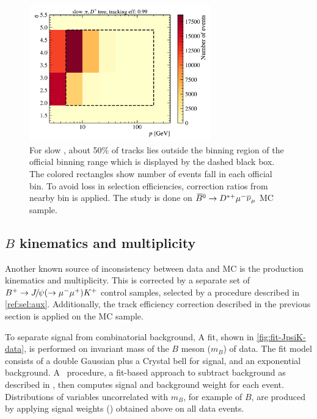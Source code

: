 \begin{figure}[htb]
    \centering
    \includegraphics[width=0.7\textwidth]{./figs-mc-correction/reweighting-tracking/Dst_spi_p_eta.pdf}
    \caption{
        For slow \pion, about 50\% of tracks lies outside the binning region
        of the official \trackcalib binning range which is displayed by the
        dashed black box.
        The colored rectangles show number of events fall in each
        official \trackcalib bin.
        To avoid loss in selection efficiencies,
        correction ratios from nearby bin is applied.
        The study is done on ${{\kern 0.18em\overline{\kern -0.18em B}}{}^0} \rightarrow {\ensuremath{{D}^{*+}}} {\ensuremath{\mu^-}} {\ensuremath{{\overline{\nu}}_\mu}}$ MC sample.
    }
    \label{fig:trackcalib-slow-pi}
\end{figure}


\subsection{$B$ kinematics and multiplicity}
\label{ref:mc-cor:init:jpsi-k}

Another known source of inconsistency between data and MC is the \B production
kinematics and multiplicity.
This is corrected by a separate set of
${{{B}^+}} \rightarrow {\ensuremath{{J\mskip -3mu/\mskip -2mu\psi}}} (\rightarrow {\ensuremath{\mu^-}}{\ensuremath{\mu^+}}) {{K}^+}$
control samples, selected by a procedure described
in \cref{ref:sel:aux}.
Additionally, the track efficiency correction described in the previous section
is applied on the \jpsi\kaon MC sample.

To separate \jpsi\kaon signal from combinatorial background,
A fit, shown in \cref{fig:fit-JpsiK-data},
is performed on invariant mass of the $B$ meson ($m_B$) of \jpsi\kaon data.
The fit model consists of a double Gaussian plus a Crystal bell for
signal, and an exponential background.
A \sPlot\ procedure,
a fit-based approach to subtract background as described in
\cite{Pivk_2005},
then computes signal and background weight for each event.
Distributions of variables uncorrelated with $m_B$, for example \pt of $B$,
are produced by applying signal weights (\sWeight) obtained above on all
data events.

